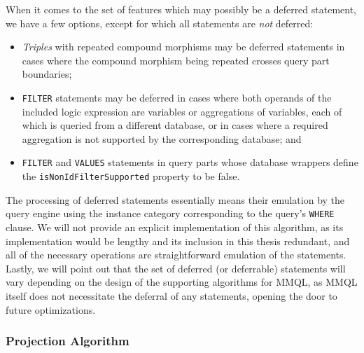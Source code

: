When it comes to the set of features which may possibly be a deferred statement, we have a few options, except for which all statements are \textit{not} deferred:

\begin{itemize}
    \item \textit{Triples} with repeated compound morphisms may be deferred statements in cases where the compound morphism being repeated crosses query part boundaries;
    \item \texttt{FILTER} statements may be deferred in cases where both operands of the included logic expression are variables or aggregations of variables, each of which is queried from a different database, or in cases where a required aggregation is not supported by the corresponding database; and
    \item \texttt{FILTER} and \texttt{VALUES} statements in query parts whose database wrappers define the \texttt{isNonIdFilterSupported} property to be false.
\end{itemize}

The processing of deferred statements essentially means their emulation by the query engine using the instance category corresponding to the query's \texttt{WHERE} clause.
We will not provide an explicit implementation of this algorithm, as its implementation would be lengthy and its inclusion in this thesis redundant, and all of the necessary operations are straightforward emulation of the statements.
Lastly, we will point out that the set of deferred (or deferrable) statements will vary depending on the design of the supporting algorithms for MMQL, as MMQL itself does not necessitate the deferral of any statements, opening the door to future optimizations.

\subsubsection{Projection Algorithm}

